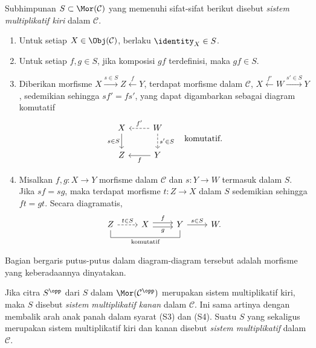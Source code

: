 \begin{definisi}\label{def:multiplicative-family}
	Subhimpunan $S \subset \Mor(\mathcal{C})$ yang memenuhi sifat-sifat
	berikut disebut \emph{sistem multiplikatif kiri} dalam $\mathcal{C}$.
	\begin{enumerate}[(S1)]
		\item Untuk setiap $X \in \Obj(\mathcal{C})$, berlaku
		$\identity_X \in S$.
		\item Untuk setiap $f, g \in S$, jika komposisi $gf$ terdefinisi, maka
		$gf \in S$.
		\item Diberikan morfisme
		$X \xrightarrow{s \in S} Z \xleftarrow{f} Y$, terdapat morfisme dalam
		$\mathcal{C}$,
		$X \xleftarrow{f'} W \xrightarrow{s' \in S} Y$, sedemikian sehingga
		$sf' = fs'$, yang dapat digambarkan sebagai diagram komutatif
		\[\begin{tikzcd}
			X \arrow[d, "{s \in S}"'] & W \arrow[dashed, l, "{f'}"'] \arrow[dashed, d, "{s' \in S}"] \\
			Z & Y \arrow[l, "f"]
		\end{tikzcd} \quad \text{komutatif}. \]
		\item Misalkan $f, g: X \to Y$ morfisme dalam $\mathcal{C}$ dan
		$s: Y \to W$ termasuk dalam $S$. Jika $sf = sg$, maka terdapat
		morfisme $t: Z \to X$ dalam $S$ sedemikian sehingga $ft = gt$.
		Secara diagramatis,
		\[\begin{tikzcd}
			Z \arrow[dashed, r, "t \in S"] \arrow[dash, rr, "\text{komutatif}"', to path={ -- ([yshift=-2ex]\tikztostart.south) -- ([yshift=-2ex]\tikztotarget.south) [midway]\tikztonodes -- (\tikztotarget)}] & X \arrow[r, shift left, "f"] \arrow[r, shift right, "g"'] & Y \arrow[r, "s \in S"] & W .
		\end{tikzcd}\]
	\end{enumerate}
	Bagian bergaris putus-putus dalam diagram-diagram tersebut adalah morfisme
	yang keberadaannya dinyatakan.

	Jika citra $S^{\opp}$ dari $S$ dalam $\Mor(\mathcal{C}^{\opp})$ merupakan
	sistem multiplikatif kiri, maka $S$ disebut \emph{sistem multiplikatif
	kanan} dalam $\mathcal{C}$. Ini sama artinya dengan membalik arah anak panah
	dalam syarat (S3) dan (S4). Suatu $S$ yang sekaligus merupakan sistem
	multiplikatif kiri dan kanan disebut \emph{sistem multiplikatif} dalam
	$\mathcal{C}$.
\end{definisi}

